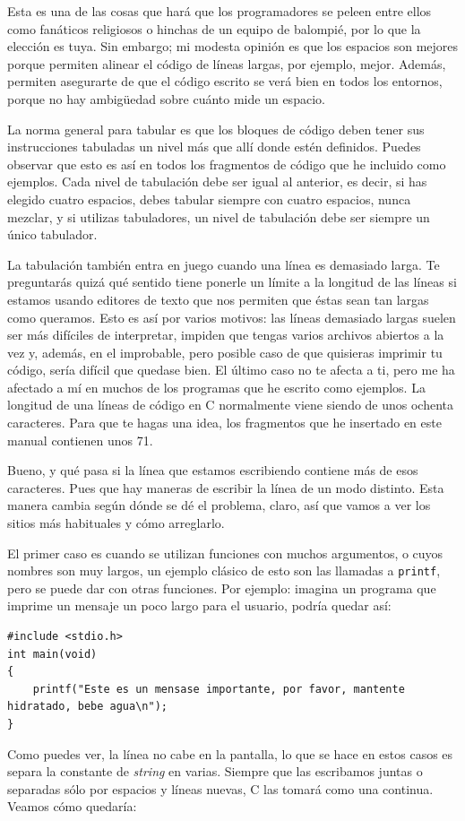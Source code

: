 \documentclass[a4paper]{article}
\begin{document}
Esta es una de las cosas que hará que los programadores se peleen entre ellos
como fanáticos religiosos o hinchas de un equipo de balompié, por lo que la
elección es tuya. Sin embargo; mi modesta opinión es que los espacios son
mejores porque permiten alinear el código de líneas largas, por ejemplo, mejor.
Además, permiten asegurarte de que el código escrito se verá bien en todos los
entornos, porque no hay ambigüedad sobre cuánto mide un espacio.

La norma general para tabular es que los bloques de código deben tener sus
instrucciones tabuladas un nivel más que allí donde estén definidos. Puedes
observar que esto es así en todos los fragmentos de código que he incluido como
ejemplos. Cada nivel de tabulación debe ser igual al anterior, es decir, si has
elegido cuatro espacios, debes tabular siempre con cuatro
espacios, nunca mezclar, y si utilizas tabuladores, un nivel
de tabulación debe ser siempre un único tabulador.

La tabulación también entra en juego cuando una línea es demasiado larga.
Te preguntarás quizá qué sentido tiene ponerle un límite a la longitud de las
líneas si estamos usando editores de texto que nos permiten que éstas sean tan
largas como queramos. Esto es así por varios motivos: las líneas demasiado
largas suelen ser más difíciles de interpretar, impiden que tengas varios
archivos abiertos a la vez y, además, en el improbable, pero posible caso de
que quisieras imprimir tu código, sería difícil que quedase bien. El último
caso no te afecta a ti, pero me ha afectado a mí en muchos de los programas
que he escrito como ejemplos. La longitud de una líneas de código en C
normalmente viene siendo de unos ochenta caracteres. Para que te hagas una idea,
los fragmentos que he insertado en este manual contienen unos 71.

Bueno, y qué pasa si la línea que estamos escribiendo contiene más de esos
caracteres. Pues que hay maneras de escribir la línea de un modo distinto.
Esta manera cambia según dónde se dé el problema, claro, así que vamos a ver
los sitios más habituales y cómo arreglarlo.

El primer caso es cuando se utilizan funciones con muchos argumentos, o cuyos
nombres son muy largos, un ejemplo clásico de esto son las llamadas a
\verb!printf!, pero se puede dar con otras funciones. Por ejemplo: imagina un
programa que imprime un mensaje un poco largo para el usuario, podría quedar
así:

\noindent
\begin{minipage}[H]{\linewidth}
\mbox{}
\begin{lstlisting}[style=C,
caption={Impresión larga},
label={lst:longprint}]
#include <stdio.h>
int main(void)
{
    printf("Este es un mensase importante, por favor, mantente hidratado, bebe agua\n");
}

\end{lstlisting}
\end{minipage}
Como puedes ver, la línea no cabe en la pantalla, lo que se hace en estos
casos es separa la constante de \textit{string} en varias. Siempre que las
escribamos juntas o separadas sólo por espacios y líneas nuevas, C las tomará
como una continua. Veamos cómo quedaría:
\end{document}
